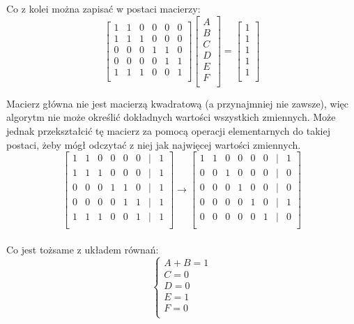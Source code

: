 \documentclass[letterpaper,12pt]{article} %
\begin{document}
Co z kolei można zapisać w postaci macierzy: \\

\[
\begin{bmatrix}
    1 & 1 & 0 & 0 & 0 & 0 \\
    1 & 1 & 1 & 0 & 0 & 0 \\
    0 & 0 & 0 & 1 & 1 & 0 \\
    0 & 0 & 0 & 0 & 1 & 1 \\
    1 & 1 & 1 & 0 & 0 & 1 \\
\end{bmatrix}
\begin{bmatrix}
    A \\ B \\ C \\ D \\ E \\ F\\
\end{bmatrix}
=
\begin{bmatrix}
    1 \\ 1 \\ 1 \\ 1 \\ 1 \\
\end{bmatrix}
\]

Macierz główna nie jest macierzą kwadratową (a przynajmniej nie zawsze), 
więc algorytm nie może określić dokładnych wartości wszystkich zmiennych. Może jednak 
przekształcić tę macierz za pomocą operacji elementarnych do takiej postaci, żeby
mógł odczytać z niej jak najwięcej wartości zmiennych. 
\[
\begin{bmatrix}
    1 & 1 & 0 & 0 & 0 & 0 & | & 1\\
    1 & 1 & 1 & 0 & 0 & 0 & | & 1\\
    0 & 0 & 0 & 1 & 1 & 0 & | & 1 \\
    0 & 0 & 0 & 0 & 1 & 1 & | & 1\\
    1 & 1 & 1 & 0 & 0 & 1 & | & 1\\
\end{bmatrix}
\longrightarrow
\begin{bmatrix}
    1 & 1 & 0 & 0 & 0 & 0 & | & 1\\
    0 & 0 & 1 & 0 & 0 & 0 & | & 0\\
    0 & 0 & 0 & 1 & 0 & 0 & | & 0 \\
    0 & 0 & 0 & 0 & 1 & 0 & | & 1\\
    0 & 0 & 0 & 0 & 0 & 1 & | & 0\\
\end{bmatrix}
\] \\
Co jest tożsame z układem równań:\\
$$
\begin{cases}
 A + B = 1 \\
 C = 0 \\
 D = 0 \\
 E = 1 \\
 F = 0 \\
\end{cases}
$$
\end{document}
